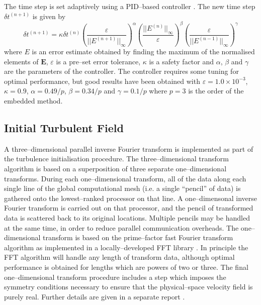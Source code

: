 \documentclass[dvips]{article}
\begin{document}
\noindent
The time step is set adaptively using a PID--based controller
\cite{KennedyCarpenterLewis}.  The new time step $\delta t^{(n+1)}$ is given
by
\begin{equation}
\delta t^{(n+1)}=\kappa\delta t^{(n)}
\left(\frac{\varepsilon}{||E^{(n+1)}||_{\infty}}\right)^{\alpha}
\left(\frac{||E^{(n)}||_{\infty}}{\varepsilon}\right)^{\beta}
\left(\frac{\varepsilon}{||E^{(n-1)}||_{\infty}}\right)^{\gamma}
\end{equation}
where $E$ is an error estimate obtained by finding the maximum of the
normalised elements of ${\mathbf E}$, $\varepsilon$ is a pre--set error
tolerance, $\kappa$ is a safety factor and $\alpha$, $\beta$ and
$\gamma$ are the parameters of the controller.  The controller requires
some tuning for optimal performance, but good results have been obtained
with $\varepsilon = 1.0\times 10^{-3}$, $\kappa=0.9$, $\alpha = 0.49/p$,
$\beta = 0.34/p$ and $\gamma = 0.1/p$ where $p=3$ is the order of the
embedded method.   

\subsection{Initial Turbulent Field}
\label{ParFFT}
A three--dimensional parallel inverse Fourier transform is implemented
as part of the turbulence initialisation procedure.  The
three--dimensional transform algorithm is based on a superposition of
three separate one--dimensional transforms.  During each
one--dimensional transform, all of the data along each
single line of the global computational mesh (i.e. a single ``pencil'' of data)
is gathered onto the lowest--ranked processor on that line.  A one--dimensonal
inverse Fourier transform is carried out on that processor, and the pencil of
transformed data is scattered back to its original
locations.  Multiple pencils may be handled at the same time, in
order to reduce parallel communication overheads.  The one--dimensional
transform is based on the prime--factor fast Fourier transform algorithm
\cite{Temperton} as implemented in a locally--developed FFT library
\cite{FFTlib}.  In principle the FFT algorithm
will handle any length of transform data, although optimal performance is
obtained for lengths which are powers of two or three.  The final
one--dimensional transform procedure includes a step which imposes the symmetry
conditions necessary to ensure that the physical--space velocity field
is purely real.   Further details are given in a separate report
\cite{Starturb}.

\newpage
\end{document}
